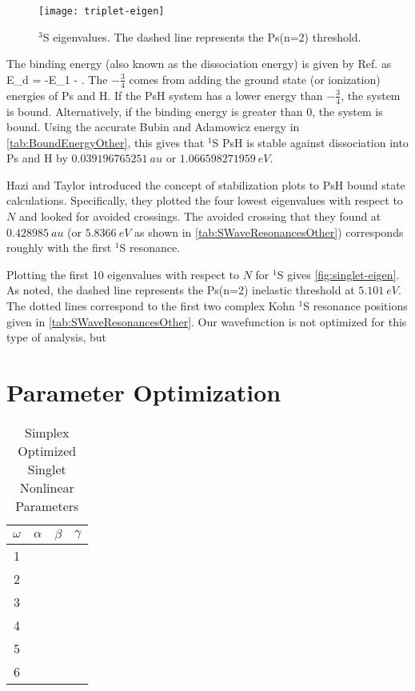 \documentclass[Dissertation.tex]{subfiles}
\begin{document}
\begin{figure}[H]
	\centering
	\texttt{[image: triplet-eigen]}
	\caption{$^3$S eigenvalues. The dashed line represents the Ps(n=2) threshold.}
	\label{fig:triplet-eigen}
\end{figure}


The binding energy (also known as the dissociation energy) is given by Ref. \cite{Page1974} as
\beq
\label{eq:DissociationE}
E_d = -E_1 -  .
\eeq
The $-\frac{3}{4}$ comes from adding the ground state (or ionization) energies of Ps and H. If the PsH system has a lower energy than $-\frac{3}{4}$, the system is bound. 
Alternatively, if the binding energy is greater than 0, the system is bound.
Using the accurate Bubin and Adamowicz energy in \cref{tab:BoundEnergyOther}, this gives that $^1$S PsH is stable against dissociation into Ps and H by $\SI{0.039 196 765 251}{au}$ or $\SI{1.066 598 271 959}{eV}$. 

Hazi and Taylor \cite{Hazi1970} introduced the concept of stabilization plots to PsH bound state calculations. Specifically, they plotted the four lowest eigenvalues with respect to $N$ and looked for avoided crossings. The avoided crossing that they found at $\SI{0.428 985}{au}$ (or $\SI{5.8366}{eV}$ as shown in \cref{tab:SWaveResonancesOther}) corresponds roughly with the first $^1$S resonance.

Plotting the first 10 eigenvalues with respect to $N$ for $^1$S gives \cref{fig:singlet-eigen}. As noted, the dashed line represents the Ps(n=2) inelastic threshold at $\SI{5.101}{eV}$. The dotted lines correspond to the first two complex Kohn $^1$S resonance positions given in \cref{tab:SWaveResonancesOther}. Our wavefunction is not optimized for this type of analysis, but 













\section{Parameter Optimization}
\label{sec:BoundOptimization}


\setlength{\abovecaptionskip}{6pt}   %
\setlength{\belowcaptionskip}{6pt}   %
\begin{table}[ht]
\caption{Simplex Optimized Singlet Nonlinear Parameters} %
\centering
\begin{tabular}{c c c c}
\hline\hline
$\omega$ & $\alpha$ & $\beta$ & $\gamma$ \\ [0.5ex]
\hline
1 &  &  &  \\
2 &  &  &  \\
3 &  &  &  \\
4 &  &  &  \\
5 &  &  &  \\
6 &  &  &  \\
\hline\hline
\end{tabular}
\label{table:NonlinearOptimized1SSimplex}
\end{table}



%
%
\end{document}
